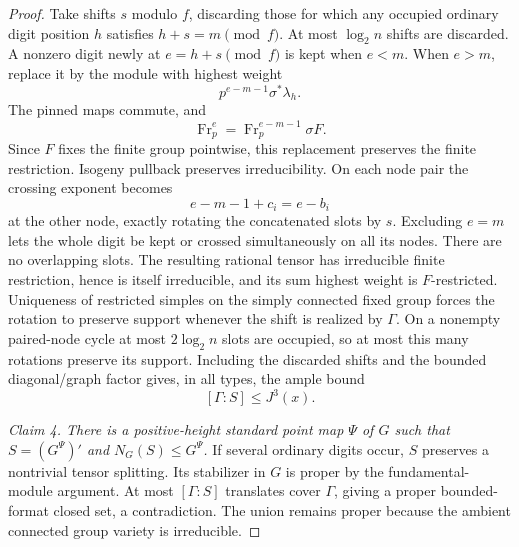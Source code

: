 \begin{proof}
Take shifts $s$ modulo $f$, discarding those for which any occupied
ordinary digit position $h$ satisfies $h+s=m\pmod f$.  At most
$\log_2n$ shifts are discarded.  A nonzero digit newly at
$e=h+s\pmod f$ is kept when $e<m$.  When $e>m$, replace it by the
module with highest weight
\begin{equation}\label{q:crossing-digit}
                         p^{e-m-1}\sigma^*\lambda_h.
\end{equation}
The pinned maps commute, and
\[
 \operatorname{Fr}_p^e=
       \operatorname{Fr}_p^{e-m-1}\sigma F.
\]
Since $F$ fixes the finite group pointwise, this replacement preserves
the finite restriction.  Isogeny pullback preserves irreducibility.
On each node pair the crossing exponent becomes
\[
               e-m-1+c_i=e-b_i
\]
at the other node, exactly rotating the concatenated slots by $s$.
Excluding $e=m$ lets the whole digit be kept or crossed simultaneously
on all its nodes.  There are no overlapping slots.  The resulting
rational tensor has irreducible finite restriction, hence is itself
irreducible, and its sum highest weight is $F$-restricted.  Uniqueness
of restricted simples on the simply connected fixed group forces the
rotation to preserve support whenever the shift is realized by
$\Gamma$.  On a nonempty paired-node cycle at most $2\log_2n$ slots
are occupied, so at most this many rotations preserve its support.
Including the discarded shifts and the bounded diagonal/graph factor
gives, in all types, the ample bound
\begin{equation}\label{q:outer-index}
                           [\Gamma:S]\le J^3(x).
\end{equation}

\emph{Claim 4. There is a positive-height standard point map $\Psi$ of $G$
such that $S=(G^\Psi)'$ and $N_G(S)\le G^\Psi$.}
If several ordinary digits occur, $S$ preserves a nontrivial tensor
splitting.  Its stabilizer in $G$ is proper by the fundamental-module
argument.  At most $[\Gamma:S]$ translates cover $\Gamma$, giving a
proper bounded-format closed set, a contradiction.  The union remains
proper because the ambient connected group variety is irreducible.


\end{proof}
